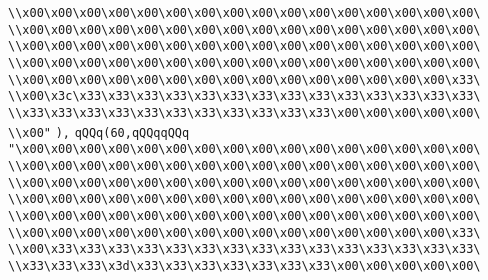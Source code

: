 \verb|\\x00\x00\x00\x00\x00\x00\x00\x00\x00\x00\x00\x00\x00\x00\x00\x00\|\newline
\verb|\\x00\x00\x00\x00\x00\x00\x00\x00\x00\x00\x00\x00\x00\x00\x00\x00\|\newline
\verb|\\x00\x00\x00\x00\x00\x00\x00\x00\x00\x00\x00\x00\x00\x00\x00\x00\|\newline
\verb|\\x00\x00\x00\x00\x00\x00\x00\x00\x00\x00\x00\x00\x00\x00\x00\x00\|\newline
\verb|\\x00\x00\x00\x00\x00\x00\x00\x00\x00\x00\x00\x00\x00\x00\x00\x33\|\newline
\verb|\\x00\x3c\x33\x33\x33\x33\x33\x33\x33\x33\x33\x33\x33\x33\x33\x33\|\newline
\verb|\\x33\x33\x33\x33\x33\x33\x33\x33\x33\x33\x33\x00\x00\x00\x00\x00\|\newline
\verb|\\x00"|\newline
\verb|),|\newline
\verb|qQQq(60,qQQqqQQq|\newline
\verb|"\x00\x00\x00\x00\x00\x00\x00\x00\x00\x00\x00\x00\x00\x00\x00\x00\|\newline
\verb|\\x00\x00\x00\x00\x00\x00\x00\x00\x00\x00\x00\x00\x00\x00\x00\x00\|\newline
\verb|\\x00\x00\x00\x00\x00\x00\x00\x00\x00\x00\x00\x00\x00\x00\x00\x00\|\newline
\verb|\\x00\x00\x00\x00\x00\x00\x00\x00\x00\x00\x00\x00\x00\x00\x00\x00\|\newline
\verb|\\x00\x00\x00\x00\x00\x00\x00\x00\x00\x00\x00\x00\x00\x00\x00\x00\|\newline
\verb|\\x00\x00\x00\x00\x00\x00\x00\x00\x00\x00\x00\x00\x00\x00\x00\x33\|\newline
\verb|\\x00\x33\x33\x33\x33\x33\x33\x33\x33\x33\x33\x33\x33\x33\x33\x33\|\newline
\verb|\\x33\x33\x33\x3d\x33\x33\x33\x33\x33\x33\x33\x00\x00\x00\x00\x00\|\newline
